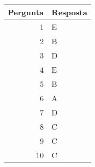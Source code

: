 \setcounter{chapter}{15}
\begin{center}
\begin{tabular}{r | l}
	Pergunta & Resposta \\ \hline
	1 & E \\
	2 & B \\
	3 & D \\
	4 & E \\
	5 & B \\
	6 & A \\
	7 & D \\
	8 & C \\
	9 & C \\
	10 & C
\end{tabular}
\end{center}
